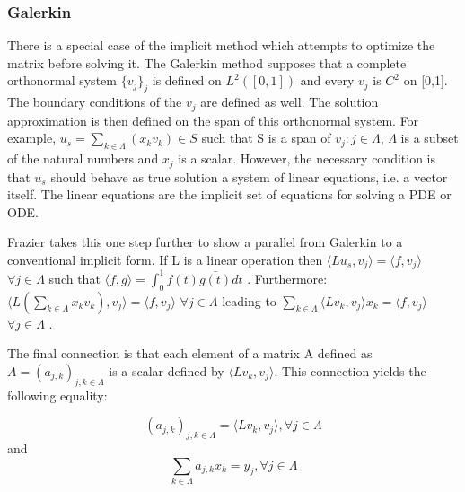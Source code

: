 \subsubsection {Galerkin}
There is a special case of the implicit method which attempts to optimize the matrix before solving it.  The Galerkin method supposes that a complete orthonormal system $\{v_j\}_j$ is defined on $L^2([0,1])$ and every $v_j$ is $C^2$ on [0,1].  The boundary conditions of the $v_j$ are defined as well.  %
The solution approximation is then defined on the span of this orthonormal system.  For example,
$u_s = \sum_{k\in \Lambda} (x_k v_k )\in S$ such that S is a span of $v_j : j\in \Lambda$, $\Lambda$ is a subset of the natural numbers and $x_j$ is a scalar.  %
However, the necessary condition is that $u_s$ should behave as true solution a system of linear equations, i.e. a vector itself.   The linear equations are %
the implicit set of equations for solving a PDE or ODE.  

Frazier takes this one step further to show a parallel from Galerkin to a conventional implicit form.  If L is a linear operation then %
$\langle L u_s, v_j \rangle = \langle f, v_j \rangle$ $\forall j\in \Lambda$ such that $\langle f, g \rangle = \int ^1 _0 f(t) \bar{g(t)} dt $ .
Furthermore: $\langle L (\sum_{k\in \Lambda} x_k v_k), v_j \rangle = \langle f, v_j \rangle$ $\forall j\in \Lambda$ leading to
$\sum_{k\in \Lambda} \langle L v_k , v_j \rangle x_k = \langle f, v_j \rangle$ $\forall j\in \Lambda$ .


The final connection is that each element of a matrix A defined as $A=(a_{j,k} )_{j,k \in \Lambda}$ is a scalar defined by  $\langle Lv_k , v_j \rangle$.  This connection yields the following equality:

\[(a_{j,k} )_{j,k \in \Lambda} = \langle Lv_k , v_j \rangle ,  \forall j\in \Lambda\] and \[\sum_{k\in \Lambda} a_{j,k} x_k = y_j,  \forall j\in \Lambda\]

